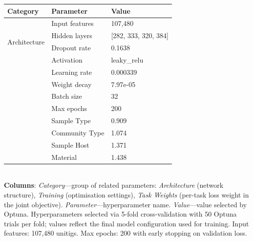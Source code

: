 \centering
\caption{Optimized hyperparameters for the DIANA multi-task neural network\label{tab:hyperparameters}}
\begin{tabular*}{\columnwidth}{@{\extracolsep{\fill}}lll@{\extracolsep{\fill}}}
\toprule
Category & Parameter & Value \\
\midrule
\multirow{4}{*}{Architecture} & Input features & 107,480 \\
 & Hidden layers & {[}282, 333, 320, 384{]} \\
 & Dropout rate & 0.1638 \\
 & Activation & leaky\_relu \\
\addlinespace
\multirow{4}{*}{Training} & Learning rate & 0.000339 \\
 & Weight decay & 7.97e-05 \\
 & Batch size & 32 \\
 & Max epochs & 200 \\
\addlinespace
\multirow{4}{*}{Task Weights} & Sample Type & 0.909 \\
 & Community Type & 1.074 \\
 & Sample Host & 1.371 \\
 & Material & 1.438 \\
\bottomrule
\end{tabular*}
\\[2mm]
{\footnotesize \textbf{Columns}: \textit{Category}---group of related parameters: \textit{Architecture} (network structure), \textit{Training} (optimisation settings), \textit{Task Weights} (per-task loss weight in the joint objective). \textit{Parameter}---hyperparameter name. \textit{Value}---value selected by Optuna. Hyperparameters selected via 5-fold cross-validation with 50 Optuna trials per fold; values reflect the final model configuration used for training. Input features: 107,480 unitigs. Max epochs: 200 with early stopping on validation loss.}